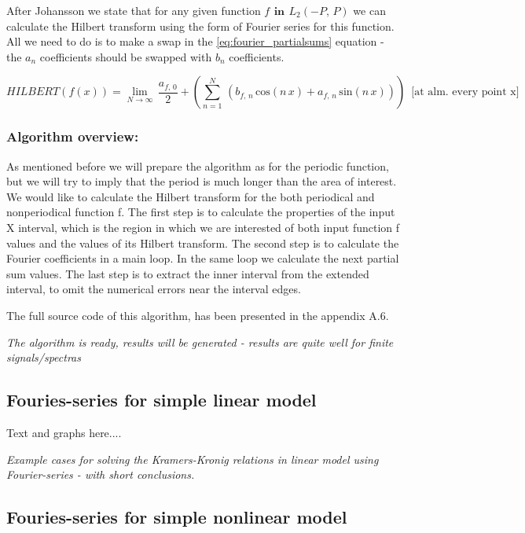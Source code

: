 \documentclass[12pt,twoside,a4paper]{article}
\numberwithin{equation}{subsection}
\numberwithin{figure}{subsection}
\begin{document}
After Johansson \cite{johansson_hilbert} we state that for any given function $f\,\ \textbf{in}\ \,{L_{2}}( - P, \,P)$ we can
calculate the Hilbert transform using the form of Fourier series for this function. All we need to do is to make a swap in the
\ref{eq:fourier_partialsums} equation - the ${a_{n}}$ coefficients should be swapped with ${b_{n}}$ coefficients.

\begin{equation} \label{eq:fourier_hilbert}
  HILBERT(f(x)) = \lim_{N\rightarrow \infty }\,\frac {{a_{f, \,0}}}{2} + (\sum_{ n=1}^{N}\,({b_{f, \,n}}\,\mathrm{cos}(n\,x)
+ {a_{f, \,n}}\, \mathrm{sin}(n\,x)))\,\mbox{ [at alm. every point x] }
\end{equation}

\subsubsection*{Algorithm overview:}

As mentioned before we will prepare the algorithm as for the periodic function, but we will try to imply that the period is much
longer than the area of interest. We would like to calculate the Hilbert transform for the both periodical and nonperiodical
function f. The first step is to calculate the properties of the input X interval, which is the region in which we are interested
of both input function f values and the values of its Hilbert transform. The second step is to calculate the Fourier coefficients
in a main loop. In the same loop we calculate the next partial sum values. The last step is to extract the inner interval from the
extended interval, to omit the numerical errors near the interval edges.

The full source code of this algorithm, has been presented in the appendix A.6.

\textit{The algorithm is ready, results will be generated - results are quite well for finite signals/spectras}

\subsection{Fouries-series for simple linear model} \label{chap:fourier_lin}

Text and graphs here.... 

\textit{Example cases for solving the Kramers-Kronig relations in linear model using Fourier-series - with short conclusions.}

\subsection{Fouries-series for simple nonlinear model} \label{chap:fourier_nlo}
\end{document}
